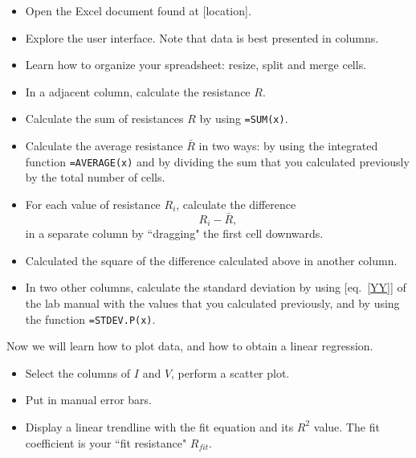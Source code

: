 \documentclass[12pt]{article}
\def\anhkhoi#1{{\color{olive}[#1]}}
\begin{document}
\begin{itemize}
\item Open the Excel document found at \anhkhoi{location}.
\item Explore the user interface. Note that data is best presented in columns.
\item Learn how to organize your spreadsheet: resize, split and merge cells.
\item In a adjacent column, calculate the resistance $R$. 
\item Calculate the sum of resistances $R$ by using  \verb|=SUM(x)|.
\item Calculate the average resistance $\bar{R}$ in two ways: by using the integrated function  \verb|=AVERAGE(x)| and by dividing the sum that you calculated previously by the total number of cells.
\item For each value of resistance $R_i$, calculate the difference
\begin{equation}
R_i - \bar{R},
\end{equation}
in a separate column by ``dragging" the first cell downwards.

\item Calculated the square of the difference calculated above in another column.
\item In two other columns, calculate the standard deviation by using \anhkhoi{eq.~\eqref{YY}} of the lab manual with the values that you calculated previously, and by using the function \verb|=STDEV.P(x)|. 
\end{itemize}

\noindent Now we will learn how to plot data, and how to obtain a linear regression.
\begin{itemize}
\item Select the columns of $I$ and $V$, perform a scatter plot.
\item Put in manual error bars.
\item Display a linear trendline with the fit equation and its $R^2$ value. The fit coefficient is your ``fit resistance" $R_{fit}$.
\end{itemize}

\end{document}
